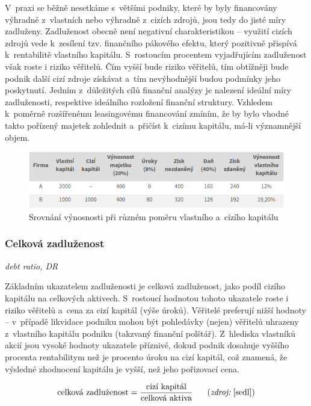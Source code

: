 V~praxi se běžně nesetkáme s~většími podniky, které by byly financovány výhradně z~vlastních nebo výhradně z~cizích zdrojů, jsou tedy do jisté míry zadluženy. Zadluženost obecně není negativní charakteristikou -- využití cizích zdrojů vede k~zesílení tzv. finančního pákového efektu, který pozitivně přispívá k~rentabilitě vlastního kapitálu.\cite{kisling} S~rostoucím procentem vyjadřujícím zadluženost však roste i riziko věřitelů. Čím vyšší bude riziko věřitelů, tím obtížněji bude podnik další cizí zdroje získávat a~tím nevýhodnější budou podmínky jeho poskytnutí.\cite{mendelu} Jedním z~důležitých cílů finanční analýzy je nalezení ideální míry zadluženosti, respektive ideálního rozložení finanční struktury. Vzhledem k~poměrně rozšířenému leasingovému financování zmíním, že by bylo vhodné takto pořízený majetek zohlednit a~přičíst k~cizímu kapitálu, má-li významnější objem.

\begin{figure}
  \centering
  \includegraphics[width=15cm]{img/tab.png}
  \caption{Srovnání výnosnosti při různém poměru vlastního a~cízího kapitálu}
\end{figure}




\subsubsection{Celková zadluženost}
\textit{debt ratio, DR}

Základním ukazatelem zadluženosti je celková zadluženost, jako podíl cizího kapitálu na celkových aktivech. S~rostoucí hodnotou tohoto ukazatele roste i riziko věřitelů a~cena za cizí kapitál (výše úroků). Věřitelé preferují nižší hodnoty -- v~případě likvidace podniku mohou být pohledávky (nejen) věřitelů uhrazeny z~vlastního kapitálu podniku (takzvaný finanční polštář).
Z~hlediska vlastníků akcií jsou vysoké hodnoty ukazatele příznivé, dokud podnik dosahuje vyššího procenta rentabilitym než je procento úroku na cizí kapitál, což znamená, že výsledné zhodnocení kapitálu je vyšší, než jeho pořizovací cena.\cite{such}

$$\vz{celková zadluženost}{cizí kapitál}{celková aktiva} \scite{sedl}$$

